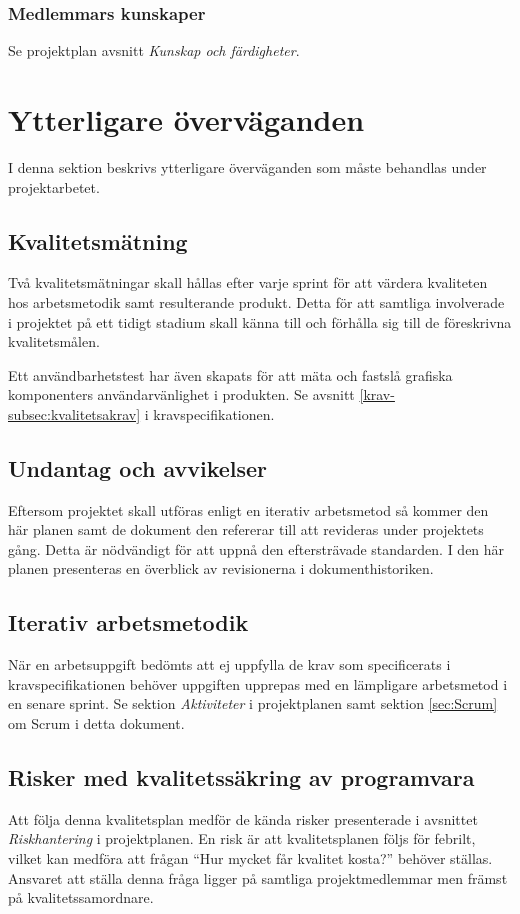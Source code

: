 \documentclass[a4paper,10pt]{article}
\begin{document}
\subsubsection{Medlemmars kunskaper}
Se projektplan avsnitt \emph{Kunskap och färdigheter}.

\section{Ytterligare överväganden}
I denna sektion beskrivs ytterligare överväganden som måste behandlas under projektarbetet.
\subsection{Kvalitetsmätning}
\label{sec:Kvalitetsmatning}
Två kvalitetsmätningar skall hållas efter varje sprint för att värdera kvaliteten hos arbetsmetodik samt resulterande produkt.
Detta för att samtliga involverade i projektet på ett tidigt stadium skall känna till och förhålla sig till de föreskrivna kvalitetsmålen.

Ett användbarhetstest har även skapats för att mäta och fastslå grafiska komponenters användarvänlighet i produkten. Se avsnitt \ref{krav-subsec:kvalitetsakrav} i kravspecifikationen.

\subsection{Undantag och avvikelser}

Eftersom projektet skall utföras enligt en iterativ arbetsmetod så kommer den här planen samt de dokument den refererar till att revideras under projektets gång. Detta är nödvändigt för att uppnå den eftersträvade standarden. I den här planen presenteras en överblick av revisionerna i dokumenthistoriken.

\subsection{Iterativ arbetsmetodik}
När en arbetsuppgift bedömts att ej uppfylla de krav som specificerats i kravspecifikationen behöver uppgiften upprepas med en lämpligare arbetsmetod i en senare sprint. Se sektion \emph{Aktiviteter} i projektplanen samt sektion \ref{sec:Scrum} om Scrum i detta dokument.

\subsection{Risker med kvalitetssäkring av programvara}
Att följa denna kvalitetsplan medför de kända risker presenterade i avsnittet \emph{Riskhantering} i projektplanen. En risk är att kvalitetsplanen följs för febrilt, vilket kan medföra att frågan “Hur mycket får kvalitet kosta?” behöver ställas. Ansvaret att ställa denna fråga ligger på samtliga projektmedlemmar men främst på kvalitetssamordnare.
\end{document}
